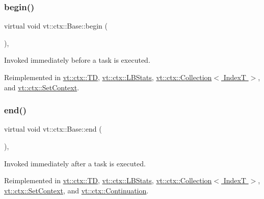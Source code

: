 \subsubsection{\texorpdfstring{begin()}{begin()}}
{\footnotesize\ttfamily virtual void vt\+::ctx\+::\+Base\+::begin (\begin{DoxyParamCaption}{ }\end{DoxyParamCaption})\hspace{0.3cm}{\ttfamily [inline]}, {\ttfamily [virtual]}}



Invoked immediately before a task is executed. 



Reimplemented in \hyperlink{structvt_1_1ctx_1_1_t_d_a5ba29186cd3ac75a48272e0ac050228b}{vt\+::ctx\+::\+TD}, \hyperlink{structvt_1_1ctx_1_1_l_b_stats_a209aad8645b7e7a4328b71c29f935da4}{vt\+::ctx\+::\+L\+B\+Stats}, \hyperlink{structvt_1_1ctx_1_1_collection_a1555355c83dd6f692c03c66882b74846}{vt\+::ctx\+::\+Collection$<$ Index\+T $>$}, and \hyperlink{structvt_1_1ctx_1_1_set_context_aa882626f5fcf98cd6e8aa61c59395b5a}{vt\+::ctx\+::\+Set\+Context}.

\mbox{\label{structvt_1_1ctx_1_1_base_a113bac732b2831caa8eed11609ccaf0e}} 
\subsubsection{\texorpdfstring{end()}{end()}}
{\footnotesize\ttfamily virtual void vt\+::ctx\+::\+Base\+::end (\begin{DoxyParamCaption}{ }\end{DoxyParamCaption})\hspace{0.3cm}{\ttfamily [inline]}, {\ttfamily [virtual]}}



Invoked immediately after a task is executed. 



Reimplemented in \hyperlink{structvt_1_1ctx_1_1_t_d_a5131b9af6b389c90c1ac908c7dcc59b9}{vt\+::ctx\+::\+TD}, \hyperlink{structvt_1_1ctx_1_1_l_b_stats_a55efc4d1d6eb579943b5b39d2a823328}{vt\+::ctx\+::\+L\+B\+Stats}, \hyperlink{structvt_1_1ctx_1_1_collection_afbbbbaa3a85469b7ddded1ded70bd83d}{vt\+::ctx\+::\+Collection$<$ Index\+T $>$}, \hyperlink{structvt_1_1ctx_1_1_set_context_a17029268846a24e61fa35339e9bdcc10}{vt\+::ctx\+::\+Set\+Context}, and \hyperlink{structvt_1_1ctx_1_1_continuation_aab0f231b54f257740a902a6b3258a33a}{vt\+::ctx\+::\+Continuation}.

